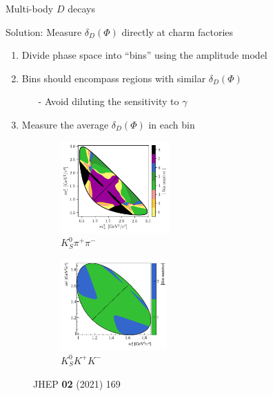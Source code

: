 \documentclass[dvipsnames]{beamer}
\begin{document}
\begin{frame}{Multi-body $D$ decays}
  \begin{center}
    {\large Solution: Measure $\delta_D(\Phi)$ directly at charm factories}
  \end{center}
  \vspace{0.2cm}
  \begin{enumerate}
    \setlength\itemsep{0.5em}
    \item{Divide phase space into ``bins'' using the amplitude model}
    \item{Bins should encompass regions with similar $\delta_D(\Phi)$}
    \begin{itemize}
      \item[-]{Avoid diluting the sensitivity to $\gamma$}
    \end{itemize}
    \item{Measure the average $\delta_D(\Phi)$ in each bin}
  \end{enumerate}
  \vspace{0.24cm}
  \begin{figure}
    \centering
    \begin{subfigure}{0.5\textwidth}
      \centering
      \includegraphics[height = 3.5cm]{Plots/KsPiPi_optimal.png}
      \vspace{-0.3cm}
      \caption*{$K_S^0\pi^+\pi^-$}
    \end{subfigure}%
    \begin{subfigure}{0.5\textwidth}
      \centering
      \includegraphics[height = 3.5cm]{Plots/KsKK_binning.png}
      \vspace{-0.3cm}
      \caption*{$K_S^0K^+K^-$}
    \end{subfigure}
    \vspace{-0.9cm}
    \caption*{\tiny JHEP \textbf{02} (2021) 169}
  \end{figure}
\end{frame}
\end{document}
